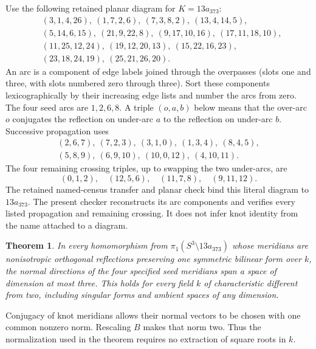 \documentclass[11pt]{article}
\newtheorem{theorem}{Theorem}
\begin{document}
Use the following retained planar diagram for $K=13a_{373}$:
\[
\begin{split}
 &(3,1,4,26),\ (1,7,2,6),\ (7,3,8,2),\ (13,4,14,5),\\
 &(5,14,6,15),\ (21,9,22,8),\ (9,17,10,16),\ (17,11,18,10),\\
 &(11,25,12,24),\ (19,12,20,13),\ (15,22,16,23),\\
 &(23,18,24,19),\ (25,21,26,20).
\end{split}
\]
An arc is a component of edge labels joined through the overpasses
(slots one and three, with slots numbered zero through three).
Sort these components lexicographically by their increasing edge lists
and number the arcs from zero. The four seed arcs are $1,2,6,8$.
A triple $(o,a,b)$ below means that the over-arc $o$ conjugates the
reflection on under-arc $a$ to the reflection on under-arc $b$.
Successive propagation uses
\begin{equation}\label{eq:trace}
\begin{gathered}
 (2,6,7),\ (7,2,3),\ (3,1,0),\ (1,3,4),\ (8,4,5),\\
 (5,8,9),\ (6,9,10),\ (10,0,12),\ (4,10,11).
\end{gathered}
\end{equation}
The four remaining crossing triples, up to swapping the two under-arcs,
are
\begin{equation}\label{eq:left}
                    (0,1,2),\quad(12,5,6),\quad
                    (11,7,8),\quad(9,11,12).
\end{equation}
The retained named-census transfer and planar check bind this literal
diagram to $13a_{373}$. The present checker reconstructs its arc
components and verifies every listed propagation and remaining crossing.
It does not infer knot identity from the name attached to a diagram.

\begin{theorem}\label{thm:reflection}
In every homomorphism from $\pi_1(S^3\setminus13a_{373})$ whose
meridians are nonisotropic orthogonal reflections preserving one
symmetric bilinear form over $k$, the normal directions of the four
specified seed meridians span a space of dimension at most three.
This holds for every field $k$ of characteristic different from two,
including singular forms and ambient spaces of any dimension.
\end{theorem}

Conjugacy of knot meridians allows their normal vectors to be chosen
with one common nonzero norm. Rescaling $B$ makes that norm two.
Thus the normalization used in the theorem requires no extraction of
square roots in $k$.
\end{document}
